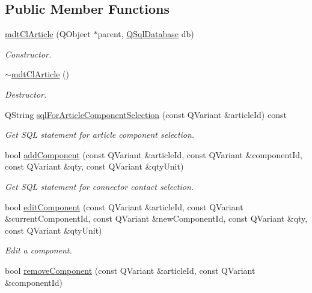 \subsection*{Public Member Functions}
\begin{DoxyCompactItemize}
\item 
\hyperlink{classmdt_cl_article_a73d0867f06c579293bbfcbfc3f305616}{mdt\-Cl\-Article} (Q\-Object $\ast$parent, \hyperlink{class_q_sql_database}{Q\-Sql\-Database} db)
\begin{DoxyCompactList}\small\item\em Constructor. \end{DoxyCompactList}\item 
\hyperlink{classmdt_cl_article_ac51272d232283ed61551e965abf3e112}{$\sim$mdt\-Cl\-Article} ()
\begin{DoxyCompactList}\small\item\em Destructor. \end{DoxyCompactList}\item 
Q\-String \hyperlink{classmdt_cl_article_ab739ef3c89503d971ded5830787dc4ff}{sql\-For\-Article\-Component\-Selection} (const Q\-Variant \&article\-Id) const 
\begin{DoxyCompactList}\small\item\em Get S\-Q\-L statement for article component selection. \end{DoxyCompactList}\item 
bool \hyperlink{classmdt_cl_article_a01746b199b707377f29a463bfc12452d}{add\-Component} (const Q\-Variant \&article\-Id, const Q\-Variant \&component\-Id, const Q\-Variant \&qty, const Q\-Variant \&qty\-Unit)
\begin{DoxyCompactList}\small\item\em Get S\-Q\-L statement for connector contact selection. \end{DoxyCompactList}\item 
bool \hyperlink{classmdt_cl_article_a065c948e09af084586a4c1b110afefbb}{edit\-Component} (const Q\-Variant \&article\-Id, const Q\-Variant \&current\-Component\-Id, const Q\-Variant \&new\-Component\-Id, const Q\-Variant \&qty, const Q\-Variant \&qty\-Unit)
\begin{DoxyCompactList}\small\item\em Edit a component. \end{DoxyCompactList}\item 
bool \hyperlink{classmdt_cl_article_a05d365a0488e479a15ff158353a41aab}{remove\-Component} (const Q\-Variant \&article\-Id, const Q\-Variant \&component\-Id)

\end{DoxyCompactItemize}

